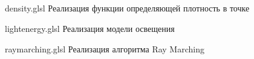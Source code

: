 \begin{appendices}
	\chapter{}
	\label{app:listings}
	
	{density.glsl} %
	{} %
	{Реализация функции определяющей плотность в точке} %
	
	
	{lightenergy.glsl} %
	{} %
	{Реализация модели освещения} %
	
	
	{raymarching.glsl} %
	{} %
	{Реализация алгоритма Ray Marching} %
	
\end{appendices}